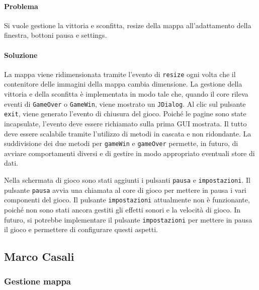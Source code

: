 \documentclass[a4paper,12pt]{report}
\begin{document}
\paragraph{Problema} Si vuole gestione la vittoria e sconfitta, resize della mappa all'adattamento della finestra, bottoni pausa e settings.
\paragraph{Soluzione} La mappa viene ridimensionata tramite l'evento di \texttt{resize} ogni volta che il contenitore delle immagini della mappa cambia dimensione. La gestione della vittoria e della sconfitta è implementata in modo tale che, quando il core rileva eventi di \texttt{GameOver} o \texttt{GameWin}, viene mostrato un \texttt{JDialog}. Al clic sul pulsante \texttt{exit}, viene generato l'evento di chiusura del gioco. Poiché le pagine sono state incapsulate, l'evento deve essere richiamato sulla prima GUI mostrata. Il tutto deve essere scalabile tramite l'utilizzo di metodi in cascata e non ridondante. La suddivisione dei due metodi per \texttt{gameWin} e \texttt{gameOver} permette, in futuro, di avviare comportamenti diversi e di gestire in modo appropriato eventuali store di dati.

Nella schermata di gioco sono stati aggiunti i pulsanti \texttt{pausa} e \texttt{impostazioni}. Il pulsante \texttt{pausa} avvia una chiamata al core di gioco per mettere in pausa i vari componenti del gioco. Il pulsante \texttt{impostazioni} attualmente non è funzionante, poiché non sono stati ancora gestiti gli effetti sonori e la velocità di gioco. In futuro, si potrebbe implementare il pulsante \texttt{impostazioni} per mettere in pausa il gioco e permettere di configurare questi aspetti.

\newpage
\subsection{Marco Casali}

\subsubsection{Gestione mappa}
\end{document}
